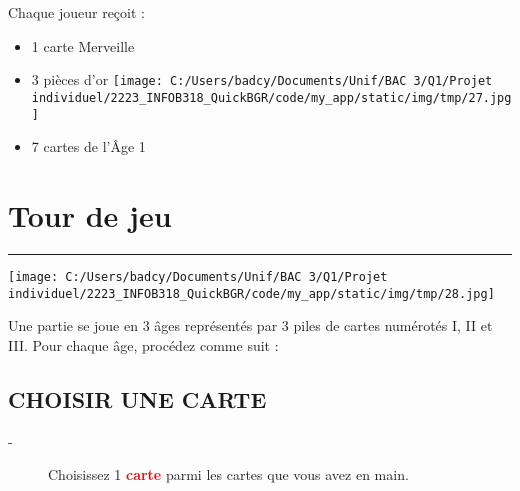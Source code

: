 \documentclass{scrartcl}%
\begin{document}
%

%
Chaque joueur reçoit :
%
\begin{itemize}%
\item%
%
 1 carte Merveille
%
\item%
%
 3 pièces d’or %
\texttt{[image: C:/Users/badcy/Documents/Unif/BAC 3/Q1/Projet individuel/2223\_INFOB318\_QuickBGR/code/my\_app/static/img/tmp/27.jpg]}%

%

%
\item%
%
 7 cartes de l'Âge 1 
%
\end{itemize}

%
\sectionfont{\color{red}}%
\subsectionfont{\color{red}}%
\subsubsectionfont{\color{red}}%
\section{ Tour de jeu
}%
\label{sec:Tourdejeu}%
\textcolor{red}{\rule{18cm}{0.07cm}}\break%
%
\begin{center}\texttt{[image: C:/Users/badcy/Documents/Unif/BAC 3/Q1/Projet individuel/2223\_INFOB318\_QuickBGR/code/my\_app/static/img/tmp/28.jpg]}\end{center}%

%

%
Une partie se joue en 3 âges représentés par 3 piles de cartes numérotés I, II et III. Pour chaque âge, procédez comme suit :


%
\subsection{ CHOISIR UNE CARTE
}%
\label{subsec:CHOISIRUNECARTE}%
\begin{description}%
\item[{-} ]%
%
 Choisissez 1 %
\textcolor{red}{%
\textbf{carte}%
}%
\textit{ }%
 parmi les cartes que vous avez en main.
%
\end{description}

%
\end{document}
